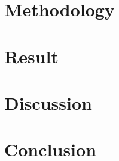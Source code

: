 \documentclass[11pt]{article}
\begin{document}
    \section{Methodology}\label{sec:methodology}
    

    \section{Result}\label{sec:result}
    

    \section{Discussion}\label{sec:discussion}
    

    \section{Conclusion}\label{sec:conclusion}
    


    
    
\end{document}
